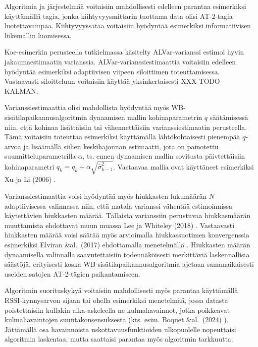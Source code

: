 \documentclass[
]{article}
\begin{document}
Algoritmia ja järjestelmää voitaisiin mahdollisesti edelleen parantaa esimerkiksi käyttämällä tagia, jonka kiihtyvyysmittarin tuottama data olisi AT-2-tagia luotettavampaa. Kiihtyvyyssataa voitaisiin hyödyntää esimerkiksi informatiivisen liikemallin luomisessa.

Koe-esimerkin perusteella tutkielmassa käsitelty ALVar-varianssi estimoi hyvin jakaumaestimaatin varianssia. ALVar-varianssiestimaattia voitaisiin edelleen hyödyntää esimerkiksi adaptiivisen viipeen siloittimen toteuttamisessa. Vastaavasti siloitteluun voitaisiin käyttää yksinkertaisesti XXX TODO KALMAN.

Varianssiestimaattia olisi mahdollista hyödyntää myös WB-sisätilapaikannusalgoritmin dynaamisen mallin kohinaparametrin \(q\) säätämisessä niin, että kohinaa lisättäisiin tai vähennettäisiin varianssiestimaatin perusteella. Tämä voitaisiin toteuttaa esimerkiksi käyttämällä lähtökohtaisesti pienempää \(q\)-arvoa ja lisäämällä siihen keskihajonnan estimaatti, jota on painotettu suunnitteluparametrilla \(\alpha\), ts. ennen dynaamisen mallin sovitusta päivtettäisiin kohinaparametri \(q_k = q_k+\alpha\sqrt{\hat{\sigma}^2_{k-1}}\). Vastaavaa mallia ovat käyttäneet esimerkiksi Xu ja Li (2006) \citep{Xu-2006}.

Varianssiestimaattia voisi hyödyntää myös hiukkasten lukumäärän \(N\) adaptiivisessa valinnassa niin, että matala varianssi vähentää estimoinnissa käytettävien hiukkasten määrää. Tällaista varianssiin perustuvaa hiukkasmäärän muuttamista ehdottavat muun muassa Lee ja Whiteley (2018) \citep{Lee-2018}. Vastaavasti hiukkasten määrää voisi säätää myös arvioimalla hiukkassuotimen konvergenssia esimerkiksi Elviran \&al.~(2017) ehdottamalla menetelmällä \citep{Elvira-2017}. Hiukkasten määrän dynaamisella valinnalla saavutettaisiin todennäköisesti merkittäviä laskennallisia säästöjä, erityisesti koska WB-sisätilapaikannusalgoritmia ajetaan samanaikaisesti useiden satojen AT-2-tägien paikantamiseen.

Algoritmin suorituskykyä voitaisiin mahdollisesti myös parantaa käyttämällä RSSI-kynnysarvon sijaan tai ohella esimerkiksi menetelmää, jossa datasta poistettaisiin kullakin aika-askeleella ne kulmahavainnot, jotka poikkeavat kulmahavaintojen suuntakonsensuksesta (kts. esim. Boquet \&al.~(2024) \citep{Boquet-2024}). Jättämällä osa havainnoista uskottavuusfunktioiden ulkopuolelle nopeuttaisi algoritmin laskentaa, mutta saattaisi parantaa myös algoritmin tarkkuutta.
\end{document}
